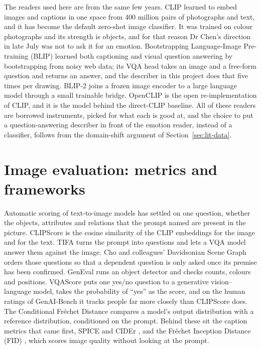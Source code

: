 The readers used here are from the same few years. CLIP \cite{radford2021learning} learned to embed images and captions in one space from 400 million pairs of photographs and text, and it has become the default zero-shot image classifier. It was trained on colour photographs and its strength is objects, and for that reason Dr Chen's direction in late July was not to ask it for an emotion. Bootstrapping Language-Image Pre-training (BLIP) \cite{li2022blip} learned both captioning and visual question answering by bootstrapping from noisy web data; its VQA head takes an image and a free-form question and returns an answer, and the describer in this project does that five times per drawing. BLIP-2 \cite{li2023blip} joins a frozen image encoder to a large language model through a small trainable bridge. OpenCLIP \cite{ilharco2021openclip} is the open re-implementation of CLIP, and it is the model behind the direct-CLIP baseline. All of these readers are borrowed instruments, picked for what each is good at, and the choice to put a question-answering describer in front of the emotion reader, instead of a classifier, follows from the domain-shift argument of Section~\ref{sec:lit-data}.

\section{Image evaluation: metrics and frameworks}
\label{sec:lit-eval}

Automatic scoring of text-to-image models has settled on one question, whether the objects, attributes and relations that the prompt named are present in the picture. CLIPScore \cite{hessel2021clipscore} is the cosine similarity of the CLIP embeddings for the image and for the text. TIFA \cite{hu2023tifa} turns the prompt into questions and lets a VQA model answer them against the image. Cho and colleagues' Davidsonian Scene Graph \cite{cho2024davidsonian} orders those questions so that a dependent question is only asked once its premise has been confirmed. GenEval \cite{ghosh2023geneval} runs an object detector and checks counts, colours and positions. VQAScore \cite{lin2024evaluating, li2024evaluating} puts one yes/no question to a generative vision--language model, takes the probability of ``yes'' as the score, and on the human ratings of GenAI-Bench it tracks people far more closely than CLIPScore does. The Conditional Fr\'echet Distance \cite{koo2026evaluating} compares a model's output distribution with a reference distribution, conditioned on the prompt. Behind these sit the caption metrics that came first, SPICE \cite{anderson2016spice} and CIDEr \cite{vedantam2015cider}, and the Fr\'echet Inception Distance (FID) \cite{heusel2017gans}, which scores image quality without looking at the prompt.

